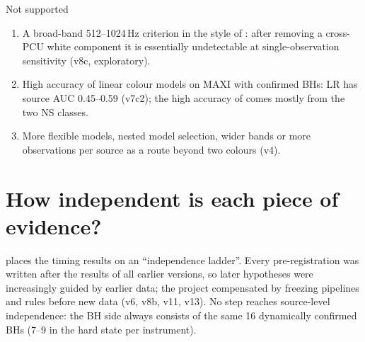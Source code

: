 \begin{cautionbox}{Not supported}
\begin{enumerate}
\item A broad-band 512--1024\,Hz criterion in the style of \citet{SunyaevRevnivtsev2000}: after removing a cross-PCU white component it is
essentially undetectable at single-observation sensitivity (v8c, exploratory).
\item High accuracy of linear colour models on MAXI with confirmed BHs: LR has source AUC 0.45--0.59 (v7c2); the high accuracy of
\citet{deBeurs2022} comes mostly from the two NS classes.
\item More flexible models, nested model selection, wider bands or more observations per source as a route beyond two colours (v4).
\end{enumerate}
\end{cautionbox}

\section{How independent is each piece of evidence?}\label{sec:synthladder}
 places the timing results on an ``independence ladder''. Every pre-registration was written after the results of all
earlier versions, so later hypotheses were increasingly guided by earlier data; the project compensated by freezing pipelines and rules
before new data (v6, v8b, v11, v13). No step reaches source-level independence: the BH side always consists of the same 16 dynamically
confirmed BHs (7--9 in the hard state per instrument).

